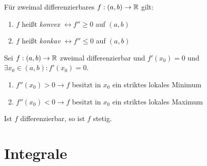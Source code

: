 \begin{definition}
	Für zweimal differenzierbares $f : (a,b) \rightarrow \mathbb{R}$ gilt:
	\begin{enumerate}[noitemsep]
		\item $f$ heißt \emph{konvex} $\leftrightarrow f'' \geq 0$ auf $(a,b)$
		\item $f$ heißt \emph{konkav} $\leftrightarrow f'' \leq 0$ auf $(a,b)$		
	\end{enumerate}
\end{definition}

\begin{satz}
	Sei $f : (a,b) \rightarrow \mathbb{R}$ zweimal differenzierbar und $f'(x_0)=0$ und $\exists x_0 \in (a,b) : f'(x_0) = 0$.
	
	\begin{enumerate}[noitemsep]
		\item $f''(x_0) > 0 \rightarrow f$ besitzt in $x_0$ ein striktes lokales Minimum
		\item $f''(x_0) < 0 \rightarrow f$ besitzt in $x_0$ ein striktes lokales Maximum	
	\end{enumerate}
\end{satz}

\begin{satz}
	Ist $f$ differenzierbar, so ist $f$ stetig.
\end{satz}

\pagebreak

\section{Integrale}

